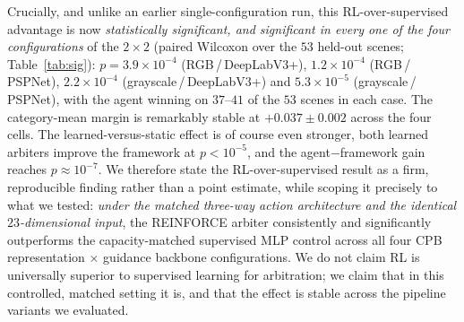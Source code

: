 \documentclass[sn-basic]{sn-jnl}
\begin{document}
Crucially, and unlike an earlier single-configuration run, this RL-over-supervised
advantage is now \emph{statistically significant, and significant in every one of the
four configurations} of the $2\times2$ (paired Wilcoxon over the $53$ held-out scenes;
Table~\ref{tab:sig}): $p=3.9\times10^{-4}$ (RGB\,/\,DeepLabV3+), $1.2\times10^{-4}$
(RGB\,/\,PSPNet), $2.2\times10^{-4}$ (grayscale\,/\,DeepLabV3+) and $5.3\times10^{-5}$
(grayscale\,/\,PSPNet), with the agent winning on $37$--$41$ of the $53$ scenes in each
case. The category-mean margin is remarkably stable at $+0.037\pm0.002$ across the four
cells. The learned-versus-static effect is of course even stronger, both learned
arbiters improve the framework at $p\!<\!10^{-5}$, and the agent$-$framework gain reaches
$p\!\approx\!10^{-7}$. We therefore state the RL-over-supervised result as a firm,
reproducible finding rather than a point estimate, while scoping it precisely to what we
tested: \emph{under the matched three-way action architecture and the identical
$23$-dimensional input}, the REINFORCE arbiter consistently and significantly
outperforms the capacity-matched supervised MLP control across all four CPB
representation $\times$ guidance backbone configurations. We do not claim RL is
universally superior to supervised learning for arbitration; we claim that in this
controlled, matched setting it is, and that the effect is stable across the pipeline
variants we evaluated.
\end{document}
